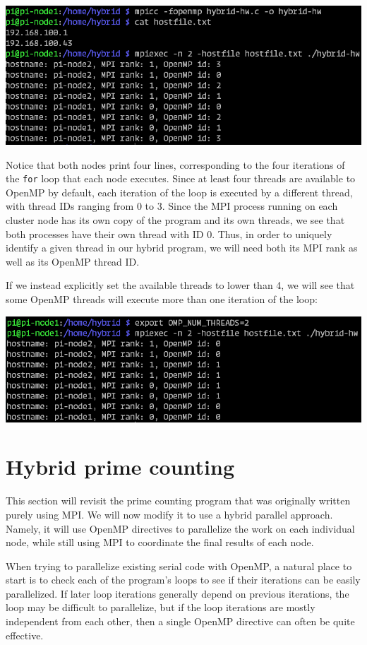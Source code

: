 \documentclass{article}
\theoremstyle{definition}
\begin{document}
\includegraphics[width=\textwidth]{images/hybrid-hw-output-1.png}

Notice that both nodes print four lines, corresponding to the four iterations of the \texttt{for} loop that each node executes. Since at least four threads are available to OpenMP by default, each iteration of the loop is executed by a different thread, with thread IDs ranging from 0 to 3. Since the MPI process running on each cluster node has its own copy of the program and its own threads, we see that both processes have their own thread with ID 0. Thus, in order to uniquely identify a given thread in our hybrid program, we will need both its MPI rank as well as its OpenMP thread ID.

If we instead explicitly set the available threads to lower than 4, we will see that some OpenMP threads will execute more than one iteration of the loop:

\includegraphics[width=\textwidth]{images/hybrid-hw-output-2.png}

\section{Hybrid prime counting}

This section will revisit the prime counting program that was originally written purely using MPI. We will now modify it to use a hybrid parallel approach. Namely, it will use OpenMP directives to parallelize the work on each individual node, while still using MPI to coordinate the final results of each node. 

When trying to parallelize existing serial code with OpenMP, a natural place to start is to check each of the program's loops to see if their iterations can be easily parallelized. If later loop iterations generally depend on previous iterations, the loop may be difficult to parallelize, but if the loop iterations are mostly independent from each other, then a single OpenMP directive can often be quite effective.
\end{document}

